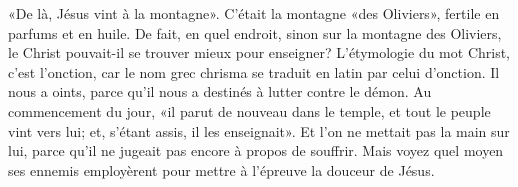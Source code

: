 «De là, Jésus vint à la montagne».
C’était la montagne «des Oliviers», fertile en parfums et en huile.
De fait, en quel endroit, sinon sur la montagne des Oliviers,
	le Christ pouvait-il se trouver mieux pour enseigner?
L’étymologie du mot Christ, c’est l’onction,
	car le nom grec chrisma se traduit en latin par celui d’onction.
Il nous a oints, parce qu’il nous a destinés à lutter contre le démon.
Au commencement du jour, «il parut de nouveau dans le temple,
	et tout le peuple vint vers lui;
	et, s’étant assis, il les enseignait».
Et l’on ne mettait pas la main sur lui,
	parce qu’il ne jugeait pas encore à propos de souffrir.
Mais voyez quel moyen ses ennemis employèrent
	pour mettre à l’épreuve la douceur de Jésus.
